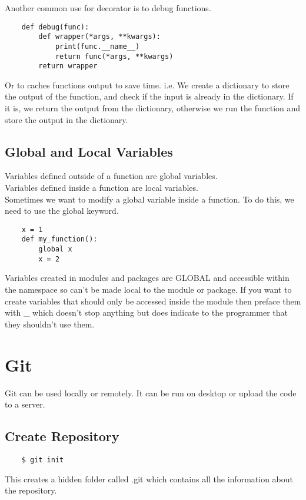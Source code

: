 \documentclass[12pt,a4paper]{article}
\begin{document}
Another common use for decorator is to debug functions.\\
\begin{lstlisting}
    def debug(func):
        def wrapper(*args, **kwargs):
            print(func.__name__)
            return func(*args, **kwargs)
        return wrapper
\end{lstlisting}

Or to caches functions output to save time. i.e. We create a dictionary to store the output of the function, and check if the input is already in the dictionary. If it is, we return the output from the dictionary, otherwise we run the function and store the output in the dictionary.\\

\subsection{Global and Local Variables}
Variables defined outside of a function are global variables.\\
Variables defined inside a function are local variables.\\
Sometimes we want to modify a global variable inside a function. To do this, we need to use the global keyword.\\
\begin{lstlisting}
    x = 1
    def my_function():
        global x
        x = 2
\end{lstlisting}

Variables created in modules and packages are GLOBAL and accessible within the namespace so can't be made local to the module or package.  If you want to create variables that should only be accessed inside the module then preface them with \_ which doesn't stop anything but does indicate to the programmer that they shouldn't use them.


\section{Git}
Git can be used locally or remotely. It can be run on desktop or upload the code to a server.\\
\subsection{Create Repository}
\begin{lstlisting}
    $ git init
\end{lstlisting}
This creates a hidden folder called .git which contains all the information about the repository.\\
\end{document}
